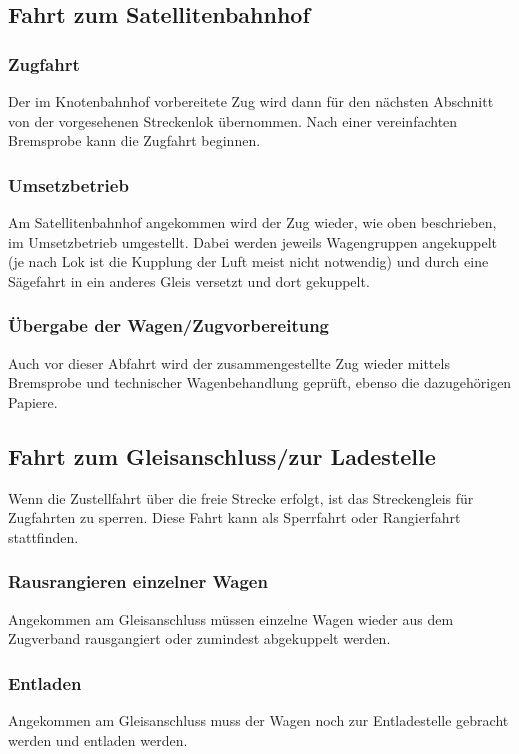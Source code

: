 \subsection{Fahrt zum Satellitenbahnhof}
\subsubsection{Zugfahrt}\label{sec:Zugfahrt2}
Der im Knotenbahnhof vorbereitete Zug wird dann für den nächsten Abschnitt von der vorgesehenen Streckenlok übernommen. Nach einer vereinfachten \gls{Bremsprobe} kann die \gls{Zugfahrt} beginnen.\par
\subsubsection{Umsetzbetrieb}\label{sec:Umsetzbetrieb}
Am Satellitenbahnhof angekommen wird der Zug wieder, wie oben beschrieben, im Umsetzbetrieb umgestellt. Dabei werden
jeweils Wagengruppen angekuppelt (je nach Lok ist die Kupplung der Luft meist nicht notwendig) und durch eine Sägefahrt in ein anderes Gleis versetzt und dort gekuppelt.
\subsubsection{Übergabe der Wagen/Zugvorbereitung}
Auch  vor  dieser  Abfahrt  wird der  zusammengestellte  Zug wieder mittels \gls{Bremsprobe} und technischer Wagenbehandlung geprüft, ebenso die dazugehörigen Papiere.

\subsection{Fahrt zum Gleisanschluss/zur Ladestelle}\label{sec:FahrtGA}
Wenn die Zustellfahrt über die freie Strecke erfolgt, ist das Streckengleis für Zugfahrten zu sperren. Diese Fahrt kann als Sperrfahrt oder Rangierfahrt stattfinden.
\subsubsection{Rausrangieren einzelner Wagen}\label{sec:RausrangWagen}
Angekommen am \gls{Gleisanschluss} müssen einzelne Wagen wieder aus dem Zugverband rausgangiert oder zumindest abgekuppelt werden.
\subsubsection{Entladen}
Angekommen am \gls{Gleisanschluss} muss der Wagen noch zur Entladestelle gebracht werden und entladen werden.